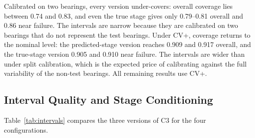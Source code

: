 Calibrated on two bearings, every version under-covers: overall
coverage lies between 0.74 and 0.83, and even the true stage gives only
0.79--0.81 overall and 0.86 near failure. The intervals are narrow
because they are calibrated on two bearings that do not represent the
test bearings. Under CV+, coverage returns to the nominal level: the
predicted-stage version reaches 0.909 and 0.917 overall, and the
true-stage version 0.905 and 0.910 near failure. The intervals are
wider than under split calibration, which is the expected price of
calibrating against the full variability of the non-test bearings.
All remaining results use CV+.

\subsection{Interval Quality and Stage Conditioning}
\label{sec:res_intervals}

Table~\ref{tab:intervals} compares the three versions of C3 for the
four configurations.

